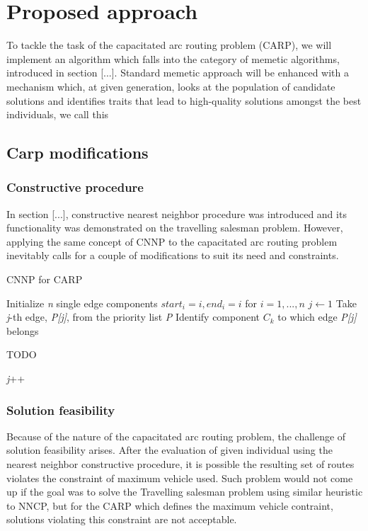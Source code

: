 \documentclass[twoside]{ctuthesis}
\theoremstyle{plain}
\theoremstyle{definition}
\theoremstyle{note}
\begin{document}
\section{Proposed approach}
To tackle the task of the capacitated arc routing problem (CARP), we will implement an algorithm which falls into the category of memetic algorithms, introduced in section [...]. Standard memetic approach will be enhanced with a mechanism which, at given generation, looks at the population of candidate solutions and identifies traits that lead to high-quality solutions amongst the best individuals, we call this 

\subsection{Carp modifications}

\subsubsection{Constructive procedure}
In section [...], constructive nearest neighbor procedure was introduced and its functionality was demonstrated on the travelling salesman problem. However, applying the same concept of CNNP to the capacitated arc routing problem inevitably calls for a couple of modifications to suit its need and constraints.
	
\begin{algorithm}
\caption{CNNP for CARP}\label{alg:cap}
\begin{algorithmic}[1]
	\State Initialize \emph{n} single edge components \emph{$ start_i = i, end_i = i $} for \emph{$ i = 1, ..., n $}
	\State $j \gets 1$
	\State Take \emph{j}-th edge, \emph{P[j]}, from the priority list \emph{P}
	\State Identify component \emph{$ C_k $} to which edge \emph{P[j]} belongs
	
	TODO
	
	\State \emph{j}++
	\EndWhile
	
	
\end{algorithmic}
\end{algorithm}


 

\subsubsection{Solution feasibility}
Because of the nature of the capacitated arc routing problem, the challenge of solution feasibility arises. After the evaluation of given individual using the nearest neighbor constructive procedure, it is possible the resulting set of routes violates the constraint of maximum vehicle used. Such problem would not come up if the goal was to solve the Travelling salesman problem using similar heuristic to NNCP, but for the CARP which defines the maximum vehicle contraint, solutions violating this constraint are not acceptable. 
\end{document}
